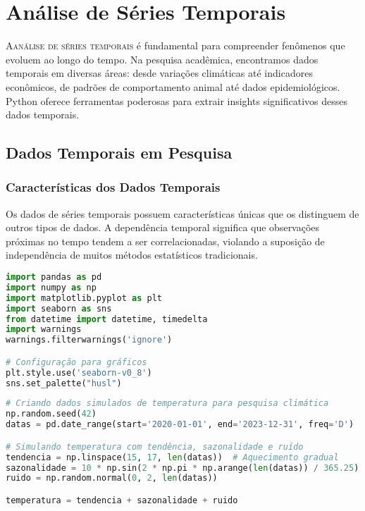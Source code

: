 
\chapter{Análise de Séries Temporais}

\lettrine{A}{análise de séries temporais} é fundamental para compreender fenômenos que evoluem ao longo do tempo. Na pesquisa acadêmica, encontramos dados temporais em diversas áreas: desde variações climáticas até indicadores econômicos, de padrões de comportamento animal até dados epidemiológicos. Python oferece ferramentas poderosas para extrair insights significativos desses dados temporais.

\section{Dados Temporais em Pesquisa}

\subsection{Características dos Dados Temporais}

Os dados de séries temporais possuem características únicas que os distinguem de outros tipos de dados. A dependência temporal significa que observações próximas no tempo tendem a ser correlacionadas, violando a suposição de independência de muitos métodos estatísticos tradicionais.

\begin{pythonbox}
\begin{lstlisting}[language=Python]
import pandas as pd
import numpy as np
import matplotlib.pyplot as plt
import seaborn as sns
from datetime import datetime, timedelta
import warnings
warnings.filterwarnings('ignore')

# Configuração para gráficos
plt.style.use('seaborn-v0_8')
sns.set_palette("husl")
\end{lstlisting}
\end{pythonbox}

\begin{pythonbox}
\begin{lstlisting}[language=Python]
# Criando dados simulados de temperatura para pesquisa climática
np.random.seed(42)
datas = pd.date_range(start='2020-01-01', end='2023-12-31', freq='D')

# Simulando temperatura com tendência, sazonalidade e ruído
tendencia = np.linspace(15, 17, len(datas))  # Aquecimento gradual
sazonalidade = 10 * np.sin(2 * np.pi * np.arange(len(datas)) / 365.25)
ruido = np.random.normal(0, 2, len(datas))

temperatura = tendencia + sazonalidade + ruido
\end{lstlisting}
\end{pythonbox}

